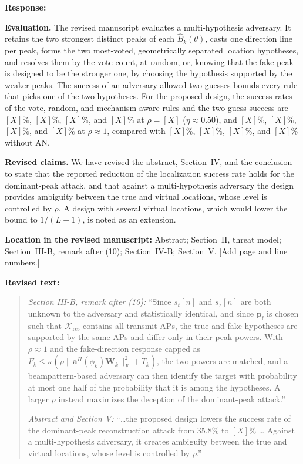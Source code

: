 \documentclass[a4paper,12pt]{article}
\newenvironment{response}{\par\textbf{Response:}\par}{\par}
\newcommand{\revisionlocation}[1]{\par\textbf{Location in the revised manuscript:} #1\par}
\newenvironment{revisedtext}{%
  \par\textbf{Revised text:}\begin{quote}\color{red}
}{\end{quote}}
\begin{document}
\begin{response}
\textbf{Evaluation.} The revised manuscript evaluates a multi-hypothesis
adversary. It retains the two strongest distinct peaks of each
$\widehat{B}_k(\theta)$, casts one direction line per peak, forms the two
most-voted, geometrically separated location hypotheses, and resolves them
by the vote count, at random, or, knowing that the fake peak is designed to
be the stronger one, by choosing the hypothesis supported by the weaker
peaks. The success of an adversary allowed two guesses bounds every rule
that picks one of the two hypotheses. For the proposed design, the success
rates of the vote, random, and mechanism-aware rules and the two-guess
success are $[X]\%$, $[X]\%$, $[X]\%$, and $[X]\%$ at $\rho=[X]$
($\eta\approx0.50$), and $[X]\%$, $[X]\%$, $[X]\%$, and $[X]\%$ at
$\rho\approx1$, compared with $[X]\%$, $[X]\%$, $[X]\%$, and $[X]\%$
without AN.

\textbf{Revised claims.} We have revised the abstract, Section~IV, and the
conclusion to state that the reported reduction of the localization success
rate holds for the dominant-peak attack, and that against a multi-hypothesis
adversary the design provides ambiguity between the true and virtual
locations, whose level is controlled by $\rho$. A design with several
virtual locations, which would lower the bound to $1/(L+1)$, is noted as an
extension.
\end{response}
\revisionlocation{Abstract; Section~II, threat model; Section~III-B,
remark after (10); Section~IV-B; Section~V. [Add page and line numbers.]}
\begin{revisedtext}
\textit{Section III-B, remark after (10):} ``Since $s_t[n]$ and $s_z[n]$
are both unknown to the adversary and statistically identical, and since
$\mathbf{p}_{\mathrm{f}}$ is chosen such that $\mathcal{K}_{\mathrm{res}}$
contains all transmit APs, the true and fake hypotheses are supported by the
same APs and differ only in their peak powers. With $\rho\approx1$ and
the fake-direction response capped as
$F_k\le\kappa(\rho\|\mathbf{a}^H(\phi_k)\mathbf{W}_k\|_F^2+T_k)$, the two
powers are matched, and a beampattern-based adversary can then identify the
target with probability at most one half of the probability that it is
among the hypotheses. A larger $\rho$ instead maximizes the deception of the
dominant-peak attack.''

\textit{Abstract and Section V:} ``\ldots the proposed design lowers the
success rate of the dominant-peak reconstruction attack from $35.8\%$ to
$[X]\%$ \ldots{} Against a multi-hypothesis adversary, it creates ambiguity
between the true and virtual locations, whose level is controlled by
$\rho$.''
\end{revisedtext}
\end{document}
